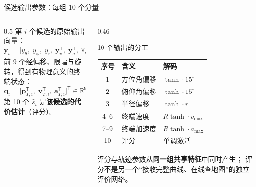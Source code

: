 \begin{frame}{候选输出参数：每组 10 个分量}
  \small
  \begin{columns}[t]
    \begin{column}{0.5\textwidth}
      第 $i$ 个候选的原始输出向量：
      \[
        \mathbf y_i=\bigl[y_\theta,\;y_\varphi,\;y_r,\;
        \mathbf y_v^{\mathsf T},\;\mathbf y_a^{\mathsf T},\;\hat s_i\bigr]^{\mathsf T}
      \]
      前 9 个经偏移、限幅与旋转，得到有物理意义的终端状态：
      \[
        \mathbf q_i=\bigl[\mathbf p_{T,i}^{\mathsf T},\;
        \mathbf v_{T,i}^{\mathsf T},\;\mathbf a_{T,i}^{\mathsf T}\bigr]^{\mathsf T}\in\mathbb R^9
      \]
      第 10 个 $\hat s_i$ 是\textbf{该候选的代价估计}（评分）。
    \end{column}
    \begin{column}{0.46\textwidth}
      \begin{block}{10 个输出的分工}
        \footnotesize
        \begin{tabular}{@{}cll@{}}
          \toprule
          序号 & 含义 & 解码 \\
          \midrule
          1 & 方位角偏移 & $\tanh\cdot15^\circ$ \\
          2 & 俯仰角偏移 & $\tanh\cdot15^\circ$ \\
          3 & 半径偏移 & $\tanh\cdot r$ \\
          4--6 & 终端速度 & $R\tanh\cdot v_{\max}$ \\
          7--9 & 终端加速度 & $R\tanh\cdot a_{\max}$ \\
          10 & 评分 & 单调激活 \\
          \bottomrule
        \end{tabular}
      \end{block}
      \begin{reading}
        \scriptsize
        评分与轨迹参数从\textbf{同一组共享特征}中同时产生；
        评分不是另一个“接收完整曲线、在线查地图”的独立评价网络。
      \end{reading}
    \end{column}
  \end{columns}
\end{frame}

